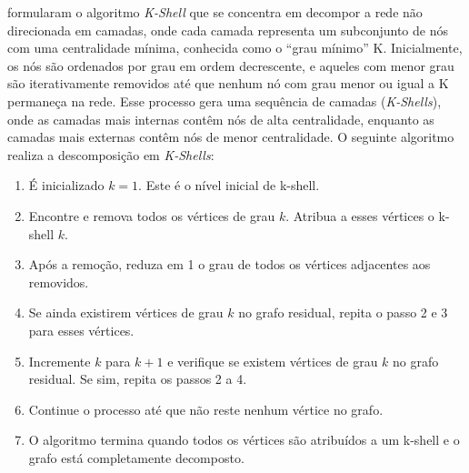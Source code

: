  formularam o algoritmo \textit{K-Shell} que se concentra em decompor a rede não direcionada em camadas, onde cada camada representa um subconjunto de nós com uma centralidade mínima, conhecida como o ``grau mínimo'' K. Inicialmente, os nós são ordenados por grau em ordem decrescente, e aqueles com menor grau são iterativamente removidos até que nenhum nó com grau menor ou igual a K permaneça na rede. Esse processo gera uma sequência de camadas (\textit{K-Shells}), onde as camadas mais internas contêm nós de alta centralidade, enquanto as camadas mais externas contêm nós de menor centralidade. 
O seguinte algoritmo realiza a descomposição em \textit{K-Shells}: 
\begin{enumerate}
    \item É inicializado \( k = 1 \). Este é o nível inicial de k-shell.
    \item Encontre e remova todos os vértices de grau \( k \). Atribua a esses vértices o k-shell \( k \).
    \item Após a remoção, reduza em 1 o grau de todos os vértices adjacentes aos removidos.
    \item Se ainda existirem vértices de grau \( k \) no grafo residual, repita o passo 2 e 3 para esses vértices.
    \item Incremente \( k \) para \( k + 1 \) e verifique se existem vértices de grau \( k \) no grafo residual. Se sim, repita os passos 2 a 4.
    \item Continue o processo até que não reste nenhum vértice no grafo.
    \item O algoritmo termina quando todos os vértices são atribuídos a um k-shell e o grafo está completamente decomposto.
\end{enumerate}

